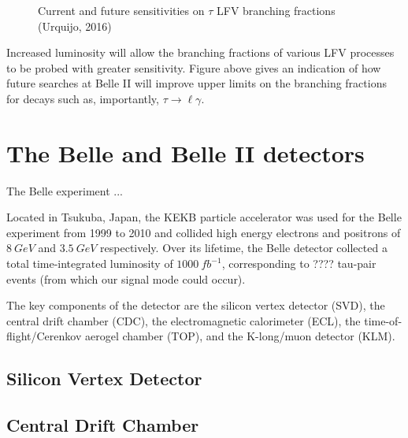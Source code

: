 \documentclass[12pt,a4paper]{article} %
\newcommand{\tlg}{\tau\to\ell\gamma}
\begin{document}
\begin{figure}[h]
\centering
\caption{Current and future sensitivities on $\tau$ LFV branching fractions (Urquijo, 2016)}
\end{figure}

Increased luminosity will allow the branching fractions of various LFV processes to be probed with greater sensitivity. Figure above gives an indication of how future searches at Belle II will improve upper limits on the branching fractions for decays such as, importantly, $\tlg$.

\pagebreak



\section{The Belle and Belle II detectors}

The Belle experiment ...

Located in Tsukuba, Japan, the KEKB particle accelerator was used for the Belle experiment from 1999 to 2010 and collided high energy electrons and positrons of $\SI{8}{GeV}$ and $\SI{3.5}{GeV}$ respectively. Over its lifetime, the Belle detector collected a total time-integrated luminosity of $\SI{1000}{fb^{-1}}$, corresponding to ???? tau-pair events (from which our signal mode could occur).

The key components of the detector are the silicon vertex detector (SVD), the central drift chamber (CDC), the electromagnetic calorimeter (ECL), the time-of-flight/Cerenkov aerogel chamber (TOP), and the K-long/muon detector (KLM).



\subsection{Silicon Vertex Detector}




\subsection{Central Drift Chamber}

\end{document}
